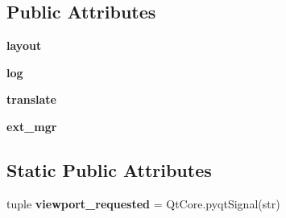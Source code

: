 \subsection*{Public Attributes}
\begin{DoxyCompactItemize}
\item 
\hypertarget{classcommotion__client_1_1GUI_1_1menu__bar_1_1MenuBar_a43b84a445a05f441662320e5f26b5599}{{\bfseries layout}}\label{classcommotion__client_1_1GUI_1_1menu__bar_1_1MenuBar_a43b84a445a05f441662320e5f26b5599}

\item 
\hypertarget{classcommotion__client_1_1GUI_1_1menu__bar_1_1MenuBar_a2397d4b257aa499bf1ef5da6e5b5faea}{{\bfseries log}}\label{classcommotion__client_1_1GUI_1_1menu__bar_1_1MenuBar_a2397d4b257aa499bf1ef5da6e5b5faea}

\item 
\hypertarget{classcommotion__client_1_1GUI_1_1menu__bar_1_1MenuBar_ad97dbe989a68d0453584c7c95137b8b4}{{\bfseries translate}}\label{classcommotion__client_1_1GUI_1_1menu__bar_1_1MenuBar_ad97dbe989a68d0453584c7c95137b8b4}

\item 
\hypertarget{classcommotion__client_1_1GUI_1_1menu__bar_1_1MenuBar_a967f47cfbc1348e41bc11026fb9ff0ac}{{\bfseries ext\-\_\-mgr}}\label{classcommotion__client_1_1GUI_1_1menu__bar_1_1MenuBar_a967f47cfbc1348e41bc11026fb9ff0ac}

\end{DoxyCompactItemize}
\subsection*{Static Public Attributes}
\begin{DoxyCompactItemize}
\item 
\hypertarget{classcommotion__client_1_1GUI_1_1menu__bar_1_1MenuBar_a10d4ce58617e1125c7f7e43512bc960a}{tuple {\bfseries viewport\-\_\-requested} = Qt\-Core.\-pyqt\-Signal(str)}\label{classcommotion__client_1_1GUI_1_1menu__bar_1_1MenuBar_a10d4ce58617e1125c7f7e43512bc960a}

\end{DoxyCompactItemize}



